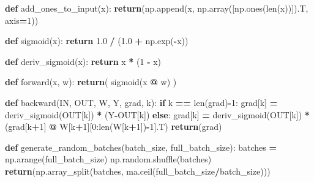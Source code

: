 \documentclass[
]{book}
\newenvironment{Shaded}{\begin{snugshade}}{\end{snugshade}}
\newcommand{\BuiltInTok}[1]{#1}
\newcommand{\ControlFlowTok}[1]{\textcolor[rgb]{0.13,0.29,0.53}{\textbf{#1}}}
\newcommand{\DecValTok}[1]{\textcolor[rgb]{0.00,0.00,0.81}{#1}}
\newcommand{\FloatTok}[1]{\textcolor[rgb]{0.00,0.00,0.81}{#1}}
\newcommand{\KeywordTok}[1]{\textcolor[rgb]{0.13,0.29,0.53}{\textbf{#1}}}
\newcommand{\NormalTok}[1]{#1}
\newcommand{\OperatorTok}[1]{\textcolor[rgb]{0.81,0.36,0.00}{\textbf{#1}}}
\begin{document}
\begin{Shaded}
\begin{Highlighting}[]
\KeywordTok{def}\NormalTok{ add\_ones\_to\_input(x):}
  \ControlFlowTok{return}\NormalTok{(np.append(x, np.array([np.ones(}\BuiltInTok{len}\NormalTok{(x))]).T, axis}\OperatorTok{=}\DecValTok{1}\NormalTok{))}



\KeywordTok{def}\NormalTok{ sigmoid(x):}
  \ControlFlowTok{return} \FloatTok{1.0} \OperatorTok{/}\NormalTok{ (}\FloatTok{1.0} \OperatorTok{+}\NormalTok{ np.exp(}\OperatorTok{{-}}\NormalTok{x))}

\KeywordTok{def}\NormalTok{ deriv\_sigmoid(x):}
  \ControlFlowTok{return}\NormalTok{ x }\OperatorTok{*}\NormalTok{ (}\DecValTok{1} \OperatorTok{{-}}\NormalTok{ x)}


\KeywordTok{def}\NormalTok{ forward(x, w):}
  \ControlFlowTok{return}\NormalTok{( sigmoid(x }\OperatorTok{@}\NormalTok{ w) )}

\KeywordTok{def}\NormalTok{ backward(IN, OUT, W, Y, grad, k):}
  \ControlFlowTok{if}\NormalTok{ k }\OperatorTok{==} \BuiltInTok{len}\NormalTok{(grad)}\OperatorTok{{-}}\DecValTok{1}\NormalTok{:}
\NormalTok{    grad[k] }\OperatorTok{=}\NormalTok{ deriv\_sigmoid(OUT[k]) }\OperatorTok{*}\NormalTok{ (Y}\OperatorTok{{-}}\NormalTok{OUT[k])}
  \ControlFlowTok{else}\NormalTok{:}
\NormalTok{    grad[k] }\OperatorTok{=}\NormalTok{ deriv\_sigmoid(OUT[k]) }\OperatorTok{*}\NormalTok{(grad[k}\OperatorTok{+}\DecValTok{1}\NormalTok{] }\OperatorTok{@}\NormalTok{ W[k}\OperatorTok{+}\DecValTok{1}\NormalTok{][}\DecValTok{0}\NormalTok{:}\BuiltInTok{len}\NormalTok{(W[k}\OperatorTok{+}\DecValTok{1}\NormalTok{])}\OperatorTok{{-}}\DecValTok{1}\NormalTok{].T)}
  \ControlFlowTok{return}\NormalTok{(grad)}

\KeywordTok{def}\NormalTok{ generate\_random\_batches(batch\_size, full\_batch\_size):}
\NormalTok{  batches }\OperatorTok{=}\NormalTok{ np.arange(full\_batch\_size)}
\NormalTok{  np.random.shuffle(batches)}
  \ControlFlowTok{return}\NormalTok{(np.array\_split(batches, ma.ceil(full\_batch\_size}\OperatorTok{/}\NormalTok{batch\_size)))}


\end{Highlighting}
\end{Shaded}
\end{document}
